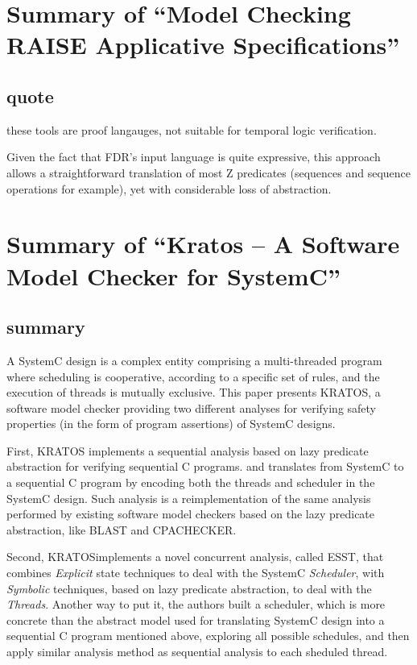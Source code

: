 \documentclass{llncs}
\newcommand{\kratos}{KRATOS}
\newcommand{\sysc}{SystemC}
\begin{document}
\section{Summary of ``Model Checking RAISE Applicative
Specifications''\cite{Perna2007Model}}
  \label{section:model_checking_raise}
\subsection{quote}
these tools are proof langauges, not suitable for temporal logic verification.

Given the fact that FDR's input language is quite expressive, this approach
allows a straightforward translation of most Z predicates (sequences and
sequence operations for example), yet with considerable loss of abstraction.

\section{Summary of ``Kratos -- A Software Model Checker for
SystemC''\cite{Cimatti2011Kratos}} 
  \label{section:kratos_model_checker}
\subsection{summary}
A SystemC design is a complex entity comprising a multi-threaded
program where scheduling is cooperative, according to a specific set of rules,
and the execution of threads is mutually exclusive. This paper presents
\kratos{}, a software model checker providing two different analyses for
verifying safety properties (in the form of program assertions) of
\sysc{} designs.

First, \kratos{} implements a sequential analysis based on lazy predicate
abstraction for verifying sequential C programs. and translates from SystemC to
a sequential C program by encoding both the threads and scheduler in the
\sysc{} design. Such analysis is a reimplementation of the same analysis
performed by existing software model checkers based on the lazy predicate
abstraction, like BLAST and CPACHECKER.

Second, \kratos implements a novel concurrent analysis, called ESST, that
combines \emph{Explicit} state techniques to deal with the \sysc{}
\emph{Scheduler}, with \emph{Symbolic} techniques, based on lazy predicate
abstraction, to deal with the \emph{Threads}. Another way to put it, the authors
built a scheduler, which is more concrete than the abstract model used for
translating \sysc{} design into a sequential C program mentioned above, 
exploring all possible schedules, and then apply similar analysis
method as sequential analysis to each sheduled thread. 
\end{document}
